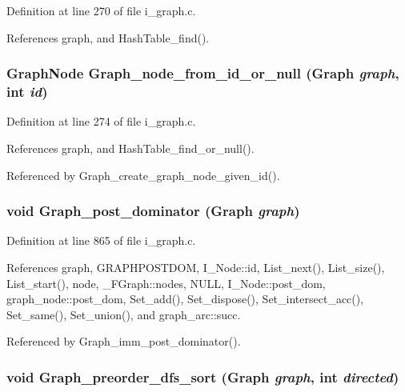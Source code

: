 Definition at line 270 of file i\_\-graph.c.

References graph, and Hash\-Table\_\-find().
\subsubsection{\setlength{\rightskip}{0pt plus 5cm}\bf{Graph\-Node} Graph\_\-node\_\-from\_\-id\_\-or\_\-null (\bf{Graph} {\em graph}, int {\em id})}\label{i__graph_8c_4f7f8f49f25f26c840bf196158ddb599}




Definition at line 274 of file i\_\-graph.c.

References graph, and Hash\-Table\_\-find\_\-or\_\-null().

Referenced by Graph\_\-create\_\-graph\_\-node\_\-given\_\-id().
\subsubsection{\setlength{\rightskip}{0pt plus 5cm}void Graph\_\-post\_\-dominator (\bf{Graph} {\em graph})}\label{i__graph_8c_8018f1ee1dd398d17963b191c5ec420a}




Definition at line 865 of file i\_\-graph.c.

References graph, GRAPHPOSTDOM, I\_\-Node::id, List\_\-next(), List\_\-size(), List\_\-start(), node, \_\-FGraph::nodes, NULL, I\_\-Node::post\_\-dom, graph\_\-node::post\_\-dom, Set\_\-add(), Set\_\-dispose(), Set\_\-intersect\_\-acc(), Set\_\-same(), Set\_\-union(), and graph\_\-arc::succ.

Referenced by Graph\_\-imm\_\-post\_\-dominator().
\subsubsection{\setlength{\rightskip}{0pt plus 5cm}void Graph\_\-preorder\_\-dfs\_\-sort (\bf{Graph} {\em graph}, int {\em directed})}\label{i__graph_8c_2670a236e7c0c5380ffd7db989c4a05f}




